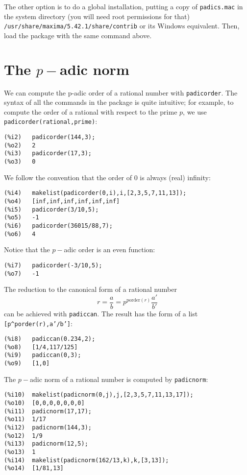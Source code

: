 \documentclass[fleqn]{cas-sc}
\begin{document}
The other option is to do a global installation, putting a copy of \texttt{padics.mac} in 
the system directory (you will need root permissions for that) \texttt{/usr/share/maxima/5.42.1/share/contrib} or its Windows equivalent. Then, load the package with the same command above.


\section{The $p-$adic norm}\label{sec2}

We can compute the p-adic order of a rational number with \texttt{padicorder}.
The syntax of all the commands in the package is quite intuitive; for example,
to compute the order of a rational with respect to the prime $p$, we use \texttt{padicorder(rational,prime)}:

\begin{verbatim}
(%i2)	padicorder(144,3);
(%o2)	2
(%i3)	padicorder(17,3);
(%o3)	0
\end{verbatim}

We follow the convention that the order of $0$ is always (real) infinity:

\begin{verbatim}
(%i4)	makelist(padicorder(0,i),i,[2,3,5,7,11,13]);
(%o4)	[inf,inf,inf,inf,inf,inf]
(%i5)	padicorder(3/10,5);
(%o5)	-1
(%i6)	padicorder(36015/88,7);
(%o6)	4
\end{verbatim}

Notice that the $p-$adic order is an even function:
\begin{verbatim}
(%i7)	padicorder(-3/10,5);
(%o7)	-1
\end{verbatim}

The reduction to the canonical form of a rational number
$$
r=\frac{a}{b}=p^{\mathrm{porder}(r)} \frac{a'}{b'}
$$
can be achieved with \texttt{padiccan}. The result has the form of a list 
\texttt{[p\^{}porder(r),a'/b']}:
\begin{verbatim}
(%i8)	padiccan(0.234,2);
(%o8)	[1/4,117/125]
(%i9)	padiccan(0,3);
(%o9)	[1,0]
\end{verbatim}

The $p-$adic norm of a rational number is computed by \texttt{padicnorm}:
\begin{verbatim}
(%i10)	makelist(padicnorm(0,j),j,[2,3,5,7,11,13,17]);
(%o10)	[0,0,0,0,0,0,0]
(%i11)	padicnorm(17,17);
(%o11)	1/17
(%i12)	padicnorm(144,3);
(%o12)	1/9
(%i13)	padicnorm(12,5);
(%o13)	1
(%i14)	makelist(padicnorm(162/13,k),k,[3,13]);
(%o14)	[1/81,13]
\end{verbatim}
\end{document}

